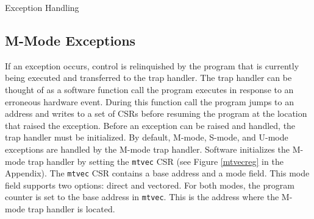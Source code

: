 \documentclass[12pt]{article}
\begin{document}
\begin{section}{Exception Handling}
\subsection{M-Mode Exceptions}
If an exception occurs, control is relinquished by the program that is currently being executed and transferred to the trap handler. The trap handler can be thought of as a software function call the program executes in response to an erroneous hardware event. During this function call the program jumps to an address and writes to a set of CSRs before resuming the program at the location that raised the exception. Before an exception can be raised and handled, the trap handler must be initialized. By default, M-mode, S-mode, and U-mode exceptions are handled by the M-mode trap handler. Software initializes the M-mode trap handler by setting the {\tt{mtvec}} CSR (see Figure \ref{mtvecreg} in the Appendix). The {\tt{mtvec}} CSR contains a base address and a mode field. This mode field supports two options: direct and vectored. For both modes, the program counter is set to the base address in {\tt{mtvec}}. This is the address where the M-mode trap handler is located.


\end{section}
\end{document}
